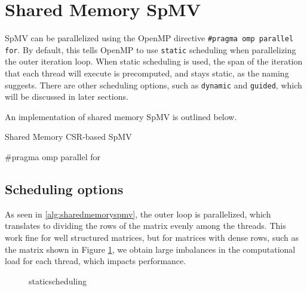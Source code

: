 \section{Shared Memory SpMV}
SpMV can be parallelized using the OpenMP directive \texttt{\#pragma omp parallel for}. By default, this tells OpenMP to use \texttt{static} scheduling when parallelizing the outer iteration loop. When static scheduling is used, the span of the iteration that each thread will execute is precomputed, and stays static, as the naming suggests. There are other scheduling options, such as \texttt{dynamic} and \texttt{guided}, which will be discussed in later sections.
\medskip

An implementation of shared memory SpMV is outlined below.
\medskip

\begin{algorithm}[H]
    \caption{Shared Memory CSR-based SpMV}
    \SetAlgoVlined

    \#pragma omp parallel for\\
    \label{alg:sharedmemoryspmv}
\end{algorithm}

\subsection{Scheduling options}
\label{sec:schedulingoptions}
As seen in \autoref{alg:sharedmemoryspmv}, the outer loop is parallelized, which translates to dividing the rows of the matrix evenly among the threads. This work fine for well structured matrices, but for matrices with dense rows, such as the matrix shown in Figure \ref{fig:staticscheduling}, we obtain large imbalances in the computational load for each thread, which impacts performance. 

\begin{figure}[H]
    \centering
    \caption{staticscheduling}
    \label{fig:staticscheduling}
\end{figure}


